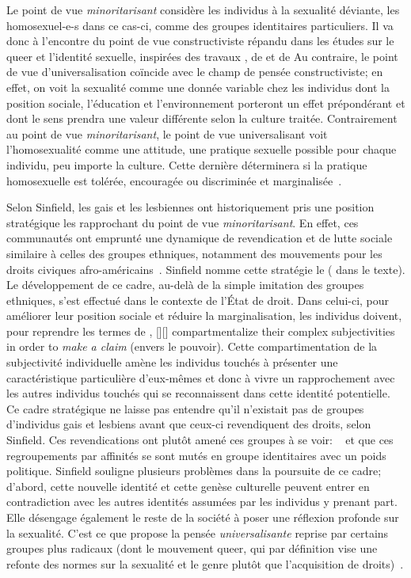 Le point de vue \emph{minoritarisant} considère les individus à la sexualité déviante, les homosexuel-e-s dans ce cas-ci, comme des groupes identitaires particuliers.
Il va donc à l'encontre du point de vue constructiviste répandu dans les études sur le queer et l'identité sexuelle, inspirées des travaux \citet{Foucault2011}, de \citet{Rubin2010} et de \citet{Butler2007}
Au contraire, le point de vue d'universalisation coïncide avec le champ de pensée constructiviste; en effet, on voit la sexualité comme une donnée variable chez les individus dont la position sociale, l'éducation et l'environnement porteront un effet prépondérant et dont le sens prendra une valeur différente selon la culture traitée.
Contrairement au point de vue \emph{minoritarisant}, le point de vue universalisant voit l'homosexualité comme une attitude, une pratique sexuelle possible pour chaque individu, peu importe la culture.
Cette dernière déterminera si la pratique homosexuelle est tolérée, encouragée ou discriminée et marginalisée~\citep[271]{Sinfield1996}.

Selon Sinfield, les gais et les lesbiennes ont historiquement pris une position stratégique les rapprochant du point de vue \emph{minoritarisant}.
En effet, ces communautés ont emprunté une dynamique de revendication et de lutte sociale similaire à celles des groupes ethniques, notamment des mouvements pour les droits civiques afro-américains~\citep[271]{Sinfield1996}.
Sinfield nomme cette stratégie le  ( dans le texte).
Le développement de ce cadre, au-delà de la simple imitation des groupes ethniques, s'est effectué dans le contexte de l'État de droit.
Dans celui-ci, pour améliorer leur position sociale et réduire la marginalisation, les individus doivent, pour reprendre les termes de \citet{Sinfield1996}, [{\citeyear[272]{Sinfield1996}}][]{\textelp{} compartmentalize their complex subjectivities in order to \emph{make a claim} (envers le pouvoir)}.
Cette compartimentation de la subjectivité individuelle amène les individus touchés à présenter une caractéristique particulière d'eux-mêmes et donc à vivre un rapprochement avec les autres individus touchés qui se reconnaissent dans cette identité potentielle.
Ce cadre stratégique ne laisse pas entendre qu'il n'existait pas de groupes d'individus gais et lesbiens avant que ceux-ci revendiquent des droits, selon Sinfield.
Ces revendications ont plutôt amené ces groupes à se voir:  ~\citep[272]{Sinfield1996} et que ces regroupements par affinités se sont mutés en groupe identitaires avec un poids politique.
Sinfield souligne plusieurs problèmes dans la poursuite de ce cadre; d'abord, cette nouvelle identité et cette genèse culturelle peuvent entrer en contradiction avec les autres identités assumées par les individus y prenant part.
Elle désengage également le reste de la société à poser une réflexion profonde sur la sexualité.
C'est ce que propose la pensée \emph{universalisante} reprise par certains groupes plus radicaux (dont le mouvement queer, qui par définition vise une refonte des normes sur la sexualité et le genre plutôt que l'acquisition de droits)~\citep[273]{Sinfield1996}.

